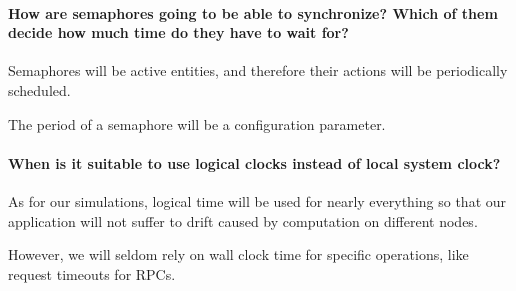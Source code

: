 \paragraph{How are semaphores going to be able to synchronize? Which of them
  decide how much time do they have to wait for?}
Semaphores will be active entities, and therefore their actions will be
periodically scheduled.

The period of a semaphore will be a configuration parameter.

\paragraph{When is it suitable to use logical clocks instead of local system
  clock?}
As for our simulations, logical time will be used for nearly everything so that
our application will not suffer to drift caused by computation on different
nodes.

However, we will seldom rely on wall clock time for specific operations, like
request timeouts for RPCs.
